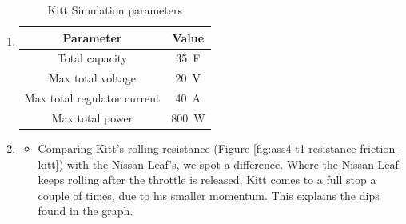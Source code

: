 \documentclass[11pt,titlepage]{report}
\begin{document}
\begin{enumerate}
\item
	\begin{table}[H]
		\centering
		\caption{Kitt Simulation parameters}
		\label{tab:ass4-sim-param}
		\begin{tabular}{c c}
			\hline\hline
			Parameter & Value \\
			\hline
			Total capacity & \SI{35}{F} \cite{maxwell-dcell-datasheet} \\
			Max total voltage & \SI{20}{V} \\
			Max total regulator current & \SI{40}{A} \\
			Max total power & \SI{800}{W} \\
			\hline
			\end{tabular}
	\end{table}
\item
	\begin{itemize}
		\item
		Comparing Kitt's rolling resistance (Figure \ref{fig:ass4-t1-resistance-friction-kitt}) with the Nissan Leaf's, we spot a difference. Where the Nissan Leaf keeps rolling after the throttle is released, Kitt comes to a full stop a couple of times, due to his smaller momentum. This explains the dips found in the graph.


\end{itemize}
\end{enumerate}
\end{document}
